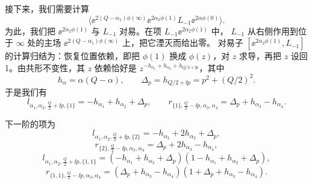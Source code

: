 
接下来，我们需要计算
\begin{equation}
  \langle \ee^{2(Q-\alpha_1)\phi(\infty)}\ee^{2\alpha_2\phi(1)}L_{-1}\ee^{2\alpha\phi(0)}\rangle .
  \tag{2.65}
\end{equation}
为此，我们把 $\ee^{2\alpha_2\phi(1)}$ 与 $L_{-1}$ 对易。在项 $L_{-1}\ee^{2\alpha_2\phi(1)}$ 中，
$L_{-1}$ 从右侧作用到位于 $\infty$ 处的主场 $\ee^{2(Q-\alpha_1)\phi(\infty)}$ 上，把它湮灭而给出零。
对易子 $[\ee^{2\alpha_2\phi(1)},L_{-1}]$ 的计算归结为：恢复位置依赖，即把 $\phi(1)$ 换成
$\phi(z)$，对 $z$ 求导，再把 $z$ 设回 1。由共形不变性，其 $z$ 依赖恰好是
$z^{-h_{\alpha_1}+h_{\alpha_2}+h_{Q/2+\ii p}}$，其中
\begin{equation}
  h_\alpha = \alpha(Q-\alpha),\qquad
  \Delta_p = h_{Q/2+\ii p} = p^2+(Q/2)^2.
  \tag{2.66}
\end{equation}
于是我们有
\begin{equation}
  l_{\alpha_1,\alpha_2,\frac{Q}{2}+\ii p,\{1\}} = -h_{\alpha_1}+h_{\alpha_2}+\Delta_p,
  \qquad
  r_{\{1\},\frac{Q}{2}-\ii p,\alpha_3,\alpha_4} = \Delta_p+h_{\alpha_3}-h_{\alpha_4}.
  \tag{2.67}
\end{equation}


下一阶的项为
\begin{equation}
  l_{\alpha_1,\alpha_2,\frac{Q}{2}+\ii p,\{2\}} = -h_{\alpha_1}+2h_{\alpha_2}+\Delta_p,
  \tag{2.68}
\end{equation}
\begin{equation}
  r_{\{2\},\frac{Q}{2}-\ii p,\alpha_3,\alpha_4} = \Delta_p+2h_{\alpha_3}-h_{\alpha_4},
  \tag{2.69}
\end{equation}
\begin{equation}
  l_{\alpha_1,\alpha_2,\frac{Q}{2}+\ii p,\{1,1\}}
  = (-h_{\alpha_1}+h_{\alpha_2}+\Delta_p)(1-h_{\alpha_1}+h_{\alpha_2}+\Delta_p),
  \tag{2.70}
\end{equation}
\begin{equation}
  r_{\{1,1\},\frac{Q}{2}-\ii p,\alpha_3,\alpha_4}
  = (\Delta_p+h_{\alpha_3}-h_{\alpha_4})(1+\Delta_p+h_{\alpha_3}-h_{\alpha_4}).
  \tag{2.71}
\end{equation}

